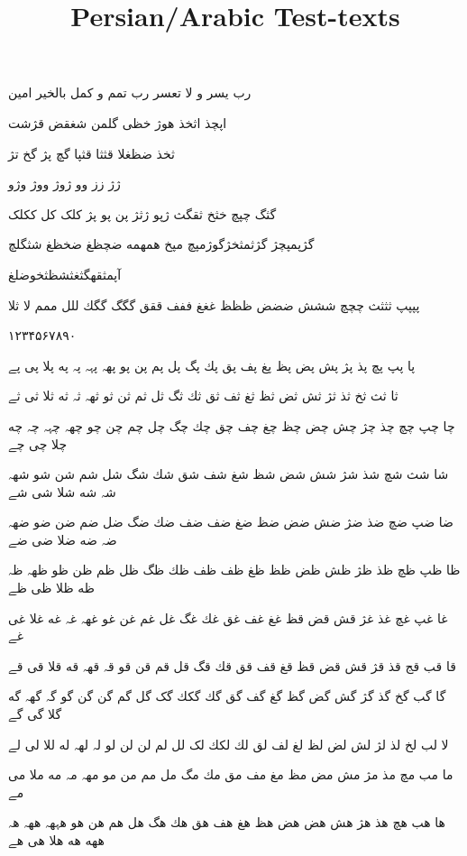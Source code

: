 \documentclass[a4paper]{article}
\title{Persian/Arabic Test-texts}
\begin{document}
\pagecolor{pagecolor}
\color{textcolor}

\newpage

\huge

رب یسر و لا تعسر رب تمم و کمل بالخیر امین

اپچذ اثخذ هوژ خظی گلمن شغقض قژشت

ثخذ ضظغلا قثثا قثپا گچ پژ گخ تژ

 ژژ زز وو ژوژ ووژ وژو

گثگ چپچ خثخ ثقگث ژپو ژثژ پن پو پژ کلک کل ککلک

گژپمپچژ گژثمثخژگوژمپچ مپخ همهمه ضچظغ ضخظغ شثگلچ

آپمثقهگثغثشظثخوضلغ

پپپپ ثثثث چچچ ششش ضضض ظظظ غغغ ففف ققق گگگ گگك للل ممم لا ثلا

۱۲۳۴۵۶۷۸۹۰

پا پپ پچ پذ پژ پش پض پظ پغ پف پق پك پگ پل پم پن پو پهہ پہہ پہ په پلا پی پے

ثا ثث ثخ ثذ ثژ ثش ثض ثظ ثغ ثف ثق ثك ثگ ثل ثم ثن ثو ثهہ ثہ ثه ثلا ثی ثے

چا چپ چچ چذ چژ چش چض چظ چغ چف چق چك چگ چل چم چن چو چهہ چہہ چہ چه چلا چی چے

شا شث شچ شذ شژ شش شض شظ شغ شف شق شك شگ شل شم شن شو شهہ شہ شه شلا شی شے

ضا ضپ ضچ ضذ ضژ ضش ضض ضظ ضغ ضف ضف ضك ضگ ضل ضم ضن ضو ضهہ ضہ ضه ضلا ضی ضے

ظا ظپ ظچ ظذ ظژ ظش ظض ظظ ظغ ظف ظف ظك ظگ ظل ظم ظن ظو ظهہ ظہ ظه ظلا ظی ظے

غا غپ غچ غذ غژ قش قض قظ غغ غف غق غك غگ غل غم غن غو غهہ غہ غه غلا غی غے

قا قب قج قذ قژ قش قض قظ قغ قف قق قك قگ قل قم قن قو قہ قهہ قه قلا قی قے

گا گب گخ گذ گژ گش گض گظ گغ گف گق گك گکك گک گل گم گن گن گو گہ گهہ گه گلا گی گے

لا لب لخ لذ لژ لش لض لظ لغ لف لق لك لکك لک لل لم لن لن لو لہ لهہ له للا لی لے

ما مب مچ مذ مژ مش مض مظ مغ مف مق مك مگ مل مم من مو مهہ مہ مه ملا می مے

ها هب هچ هذ هژ هش هض هض هظ هغ هف هق هك هگ هل هم هن هو هہهہ ههہ هہ ههه هه هلا هی هے
\end{document}

